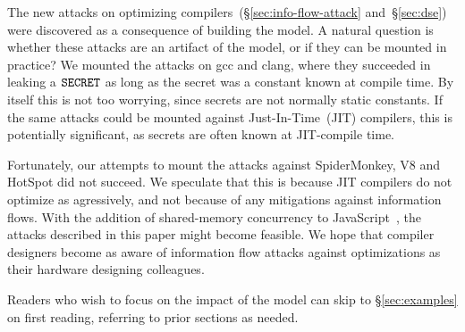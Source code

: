 The new attacks on optimizing
compilers~(\S\ref{sec:info-flow-attack} and~\S\ref{sec:dse})
were discovered as a consequence of building the model. A natural
question is whether these attacks are an artifact of the model, or if
they can be mounted in practice? We mounted the attacks on gcc and
clang, where they succeeded in leaking a $\texttt{SECRET}$ as long as the secret
was a constant known at compile time. By itself this is not too
worrying, since secrets are not normally static constants. If the same
attacks could be mounted against Just-In-Time~(JIT) compilers, this
is potentially significant, as secrets are often known at JIT-compile
time.

Fortunately, our attempts to mount the attacks against SpiderMonkey,
V8 and HotSpot did not succeed. We speculate that this is because
JIT compilers do not optimize as agressively,
and not because of any mitigations against
information flows. With the addition of shared-memory concurrency
to JavaScript~\cite[\S24.2]{ecma-262}, the attacks described in this paper might
become feasible. We hope that compiler designers become as
aware of information flow attacks against optimizations as their
hardware designing colleagues.

Readers who wish to focus on the impact of the model can skip to \S\ref{sec:examples}
on first reading, referring to prior sections as needed.


\endinput


Information flow provides a formal
foundation for end-to-end security.  Informally, a program is secure
if there is no observable dependency of low-security outputs on high-security inputs.
The precise formalization of this intuitive idea has been the topic of
extensive research \cite{Sabelfeld:2006:LIS:2312191.2314769}, encompassing a variety of language
features such as non-determinism~\cite{Wittbold1990InformationFI},
concurrency~\cite{Smith:1998:SIF:268946.268975}, reactivity~\cite{O'Neill:2006:ISI:1155442.1155677}, and
probability~\cite{Gray:1992:TMF:2699806.2699811}. The static and dynamic enforcement
of these definitions in general purpose languages~\cite{myers-popl99} has %
influenced language design and implementation.

A key parameter in defining information flow is the \emph{observational power} of the attacker model. Whereas the classical
input-output behavior is often an adequate foundation,
it has long been known~\cite{Lampson:1973:NCP:362375.362389,Biswas:2017:STC:3058791.3023872} that side-channels that leak
information arise from other observables such as execution time and
power consumption.
Recently, the Spectre family of attacks~\cite{DBLP:journals/corr/abs-1801-01203} has
shown that branch prediction, in conjunction with cache-timing side-channels,
allows adversaries to bypass dynamic security checks.

